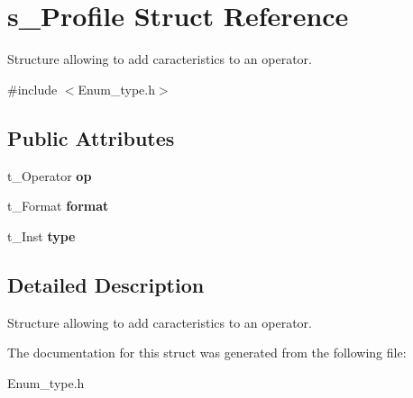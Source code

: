 \hypertarget{structs__Profile}{
\section{s\_\-Profile Struct Reference}
\label{structs__Profile}
}


Structure allowing to add caracteristics to an operator.  


{\ttfamily \#include $<$Enum\_\-type.h$>$}\subsection*{Public Attributes}
\begin{DoxyCompactItemize}
\item 
\hypertarget{structs__Profile_a3debabafa904b8f4c5e7bf2bda2a5e60}{
t\_\-Operator {\bfseries op}}
\label{structs__Profile_a3debabafa904b8f4c5e7bf2bda2a5e60}

\item 
\hypertarget{structs__Profile_ae8153795530389f76f6c56bdeac40d46}{
t\_\-Format {\bfseries format}}
\label{structs__Profile_ae8153795530389f76f6c56bdeac40d46}

\item 
\hypertarget{structs__Profile_a2a8c53bcb4fb28c3aa368a27954d9b1b}{
t\_\-Inst {\bfseries type}}
\label{structs__Profile_a2a8c53bcb4fb28c3aa368a27954d9b1b}

\end{DoxyCompactItemize}


\subsection{Detailed Description}
Structure allowing to add caracteristics to an operator. 

The documentation for this struct was generated from the following file:\begin{DoxyCompactItemize}
\item 
Enum\_\-type.h\end{DoxyCompactItemize}
